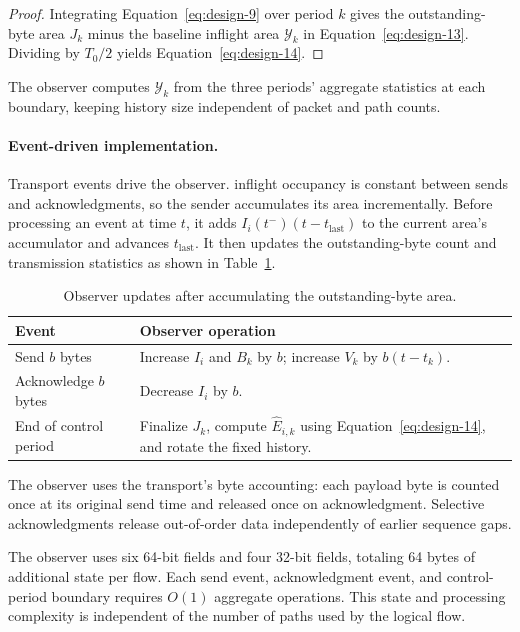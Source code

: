 \begin{proof} Integrating Equation~\eqref{eq:design-9} over period \(k\) gives the outstanding-byte area \(J_k\) minus the baseline inflight area \(\mathcal Y_k\) in Equation~\eqref{eq:design-13}. Dividing by \(T_0/2\) yields Equation~\eqref{eq:design-14}.
\end{proof}

The observer computes \(\mathcal Y_k\) from the three periods' aggregate statistics at each boundary, keeping history size independent of packet and path counts.

\paragraph{Event-driven implementation.}

Transport events drive the observer. inflight occupancy is constant between sends and acknowledgments, so the sender accumulates its area incrementally. Before processing an event at time \(t\), it adds \(I_i(t^-)(t-t_{\mathrm{last}})\) to the current area's accumulator and advances \(t_{\mathrm{last}}\). It then updates the outstanding-byte count and transmission statistics as shown in Table~\ref{tab:observer-events}.

\begin{table}[t]
\caption{Observer updates after accumulating the outstanding-byte area.}
\label{tab:observer-events}
\begin{tabularx}{\columnwidth}{@{}p{}X@{}}
\toprule
Event & Observer operation \\
\midrule
Send \(b\) bytes &
Increase \(I_i\) and \(B_k\) by \(b\); increase \(V_k\) by \(b(t-t_k)\). \\
Acknowledge \(b\) bytes & Decrease \(I_i\) by \(b\). \\
End of control period & Finalize \(J_k\), compute \(\widehat E_{i,k}\) using Equation~\eqref{eq:design-14}, and rotate the fixed history. \\
\bottomrule
\end{tabularx}
\end{table}

The observer uses the transport's byte accounting: each payload byte is counted once at its original send time and released once on acknowledgment. Selective acknowledgments release out-of-order data independently of earlier sequence gaps.

The observer uses six 64-bit fields and four 32-bit fields, totaling 64 bytes of additional state per flow. Each send event, acknowledgment event, and control-period boundary requires \(O(1)\) aggregate operations. This state and processing complexity is independent of the number of paths used by the logical flow.

